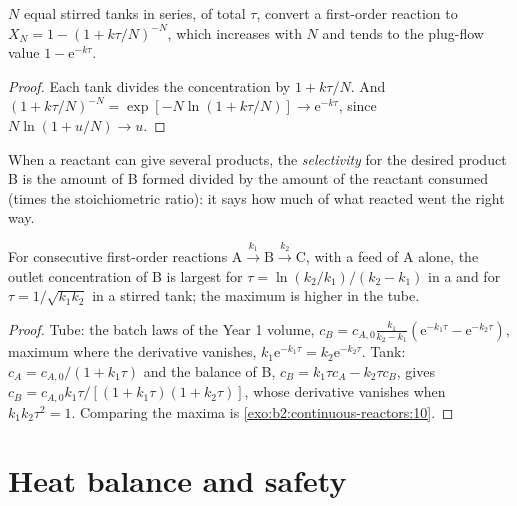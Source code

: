 \begin{proposition}\label{prop:b2:continuous-reactors:cascade}
$N$ equal stirred tanks in series, of total  $\tau$, convert a
first-order reaction to $X_N = 1 - (1 + k\tau/N)^{-N}$, which increases with
$N$ and tends to the plug-flow value $1 - \mathrm e^{-k\tau}$.
\end{proposition}

\begin{proof}
Each tank divides the concentration by $1 + k\tau/N$. And $(1 +
k\tau/N)^{-N} = \exp[-N\ln(1 + k\tau/N)] \to \mathrm e^{-k\tau}$, since
$N\ln(1 + u/N) \to u$.
\end{proof}

\begin{definition}[Selectivity]\label{def:b2:continuous-reactors:selectivity}
When a reactant can give several products, the \emph{selectivity}
for the desired product B is the amount of B formed divided by the amount of
the reactant consumed (times the stoichiometric ratio): it says how much of
what reacted went the right way.
\end{definition}

\begin{proposition}\label{prop:b2:continuous-reactors:consecutive}
For consecutive first-order reactions $\mathrm A \xrightarrow{k_1} \mathrm B
\xrightarrow{k_2} \mathrm C$, with a feed of A alone, the outlet
concentration of B is largest for $\tau = \ln(k_2/k_1)/(k_2 - k_1)$ in a
 and for $\tau = 1/\sqrt{k_1k_2}$ in a stirred tank; the
maximum is higher in the tube.
\end{proposition}

\begin{proof}
Tube: the batch laws of the Year 1 volume, $c_B = c_{A,0}\frac{k_1}{k_2 - k_1}
(\mathrm e^{-k_1\tau} - \mathrm e^{-k_2\tau})$, maximum where the derivative
vanishes, $k_1\mathrm e^{-k_1\tau} = k_2\mathrm e^{-k_2\tau}$. Tank: $c_A =
c_{A,0}/(1 + k_1\tau)$ and the balance of B, $c_B = k_1\tau c_A - k_2\tau c_B$,
gives $c_B = c_{A,0}k_1\tau/[(1 + k_1\tau)(1 + k_2\tau)]$, whose derivative
vanishes when $k_1k_2\tau^2 = 1$. Comparing the maxima is
\cref{exo:b2:continuous-reactors:10}.
\end{proof}

\section{Heat balance and safety}

